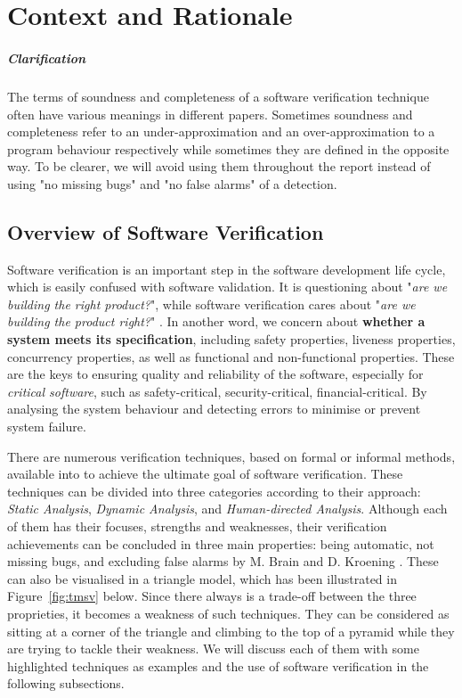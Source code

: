 \chapter{Context and Rationale}

\paragraph{Clarification} The terms of soundness and completeness of a software verification technique often have various meanings in different papers. Sometimes soundness and completeness refer to an under-approximation and an over-approximation to a program behaviour respectively while sometimes they are defined in the opposite way. To be clearer, we will avoid using them throughout the report instead of using "no missing bugs" and "no false alarms" of a detection.  

\section{Overview of Software Verification}
\label{sec:osv}
Software verification is an important step in the software development life cycle, which is easily confused with software validation. It is questioning about "\textit{are we building the right product?}", while software verification cares about "\textit{are we building the product right?}" \cite{kung2008software}. In another word, we concern about \textbf{whether a system meets its specification}, including safety properties, liveness properties, concurrency properties, as well as functional and non-functional properties. These are the keys to ensuring quality and reliability of the software, especially for \textit{critical software}, such as safety-critical, security-critical, financial-critical. By analysing the system behaviour and detecting errors to minimise or prevent system failure. 



There are numerous verification techniques, based on formal or informal methods, available into to achieve the ultimate goal of software verification. These techniques can be divided into three categories according to their approach: \textit{Static Analysis}, \textit{Dynamic Analysis}, and \textit{Human-directed Analysis}. Although each of them has their focuses, strengths and weaknesses, their verification achievements can be concluded in three main properties: being automatic, not missing bugs, and excluding false alarms by M. Brain and D. Kroening \cite{TSVP}. These can also be visualised in a triangle model, which has been illustrated in  Figure~\ref{fig:tmsv} below. Since there always is a trade-off between the three proprieties, it becomes a weakness of such techniques. They can be considered as sitting at a corner of the triangle and climbing to the top of a pyramid while they are trying to tackle their weakness. We will discuss each of them with some  highlighted techniques as examples and the use of software verification in the following subsections.

